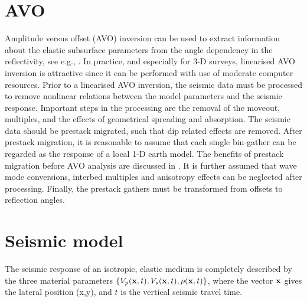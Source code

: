 \section{AVO}
Amplitude versus offset (AVO) inversion can be used to extract
information about the elastic subsurface parameters from the angle
dependency in the reflectivity, see e.g.,
\cite{hamp90,lort93,pan94,bula96b}. In practice, and especially for
3-D surveys, linearised AVO inversion is attractive since it can be
performed with use of moderate computer resources. Prior to a
linearised AVO inversion, the seismic data must be processed to remove
nonlinear relations between the model parameters and the seismic
response. Important steps in the processing are the removal of the
moveout, multiples, and the effects of geometrical spreading and
absorption. The seismic data should be prestack migrated, such that
dip related effects are removed. After prestack migration, it is
reasonable to assume that each single bin-gather can be regarded as
the response of a local 1-D earth model. The benefits of prestack
migration before AVO analysis are discussed in
\cite{brow92,mosh96,bula2001d}. It is further assumed that wave mode
conversions, interbed multiples and  anisotropy effects can be
neglected after processing.  Finally, the prestack gathers must be
transformed from offsets to reflection angles.

\section{Seismic model}

The seismic response of an isotropic, elastic medium is completely
described by the three material parameters $\{V_p(\mathbf{x},t),
V_s(\mathbf{x},t), \rho(\mathbf{x},t)\}$, where the vector $\mathbf{x}$
gives the lateral position (x,y), and $t$ is the vertical seismic
travel time.


